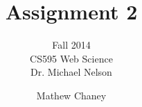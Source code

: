 \documentclass[10pt,letterpaper,bibliography=totocnumbered]{scrartcl}
\begin{document}
\author{Mathew Chaney}
\title{Assignment 2}
\subtitle{Fall 2014\\ CS595 Web Science\\ Dr. Michael Nelson}
\maketitle
\newpage

\tableofcontents
\lstlistoflistings


% 
% 

\nocite{*}


\end{document}
